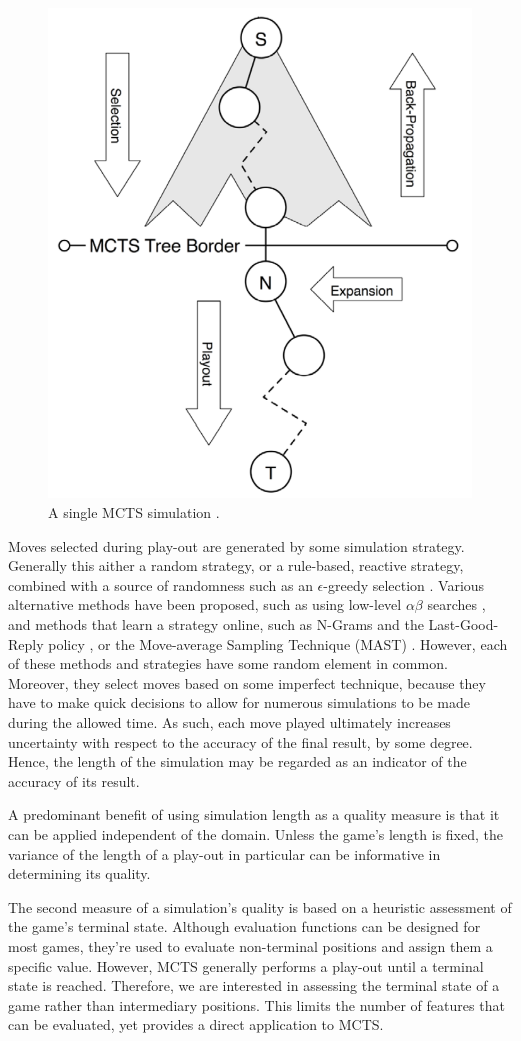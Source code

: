 \documentclass{ecai2010}
\begin{document}
\begin{figure}[t]
	\centering
	\includegraphics[width=.3\textwidth]{img/figure2.png}
	\caption{A single MCTS simulation \cite{finnsson2010learning}.}
	\label{fig:mcts-simulation}
\end{figure}

Moves selected during play-out are generated by some simulation strategy. Generally this aither a  random strategy, or a rule-based, reactive strategy, combined with a source of randomness such as an $\epsilon$-greedy selection \cite{sutton1998reinforcement, sturtevant2008analysis}. Various alternative methods have been proposed, such as using low-level $\alpha\beta$ searches \cite{winands2011a}, and methods that learn a strategy online, such as N-Grams and the Last-Good-Reply policy \cite{Tak2012}, or the Move-average Sampling Technique (MAST) \cite{finnsson2010learning}. However, each of these methods and strategies have some random element in common. Moreover, they select moves based on some imperfect technique, because they have to make quick decisions to allow for numerous simulations to be made during the allowed time. As such, each move played ultimately increases uncertainty with respect to the accuracy of the final result, by some degree. Hence, the length of the simulation may be regarded as an indicator of the accuracy of its result.

A predominant benefit of using simulation length as a quality measure is that it can be applied independent of the domain. Unless the game's length is fixed, the variance of the length of a play-out in particular can be informative in determining its quality.

The second measure of a simulation's quality is based on a heuristic assessment of the game's terminal state. Although evaluation functions can be designed for most games, they're used to evaluate non-terminal positions and assign them a specific value. However, MCTS generally performs a play-out until a terminal state is reached. Therefore, we are interested in assessing the terminal state of a game rather than intermediary positions. This limits the number of features that can be evaluated, yet provides a direct application to MCTS.
\end{document}
